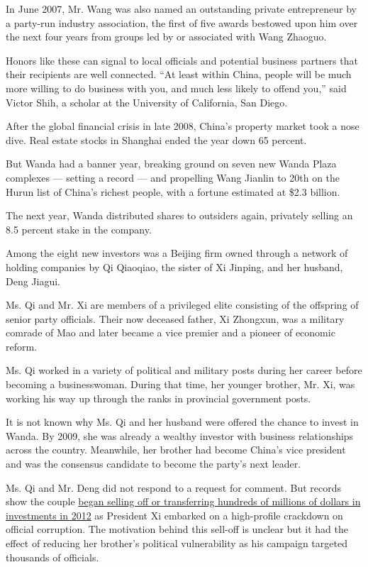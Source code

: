 In June 2007, Mr. Wang was also named an outstanding private
entrepreneur by a party-run industry association, the first of five
awards bestowed upon him over the next four years from groups led by or
associated with Wang Zhaoguo.

Honors like these can signal to local officials and potential business
partners that their recipients are well connected. ``At least within
China, people will be much more willing to do business with you, and
much less likely to offend you,'' said Victor Shih, a scholar at the
University of California, San Diego.

After the global financial crisis in late 2008, China's property market
took a nose dive. Real estate stocks in Shanghai ended the year down 65
percent.

But Wanda had a banner year, breaking ground on seven new Wanda Plaza
complexes --- setting a record --- and propelling Wang Jianlin to 20th
on the Hurun list of China's richest people, with a fortune estimated at
\$2.3 billion.

The next year, Wanda distributed shares to outsiders again, privately
selling an 8.5 percent stake in the company.

Among the eight new investors was a Beijing firm owned through a network
of holding companies by Qi Qiaoqiao, the sister of Xi Jinping, and her
husband, Deng Jiagui.

Ms. Qi and Mr. Xi are members of a privileged elite consisting of the
offspring of senior party officials. Their now deceased father, Xi
Zhongxun, was a military comrade of Mao and later became a vice premier
and a pioneer of economic reform.

Ms. Qi worked in a variety of political and military posts during her
career before becoming a businesswoman. During that time, her younger
brother, Mr. Xi, was working his way up through the ranks in provincial
government posts.

It is not known why Ms. Qi and her husband were offered the chance to
invest in Wanda. By 2009, she was already a wealthy investor with
business relationships across the country. Meanwhile, her brother had
become China's vice president and was the consensus candidate to become
the party's next leader.

Ms. Qi and Mr. Deng did not respond to a request for comment. But
records show the couple
\href{http://www.nytimes3xbfgragh.onion/2014/06/18/world/asia/chinas-president-xi-jinping-investments.html}{began
selling off or transferring hundreds of millions of dollars in
investments in 2012} as President Xi embarked on a high-profile
crackdown on official corruption. The motivation behind this sell-off is
unclear but it had the effect of reducing her brother's political
vulnerability as his campaign targeted thousands of officials.

